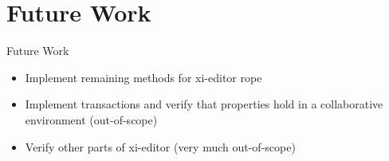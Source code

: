 \documentclass{beamer}
\begin{document}
\section{Future Work}


\begin{frame}{Future Work}
  \begin{itemize}
    \item Implement remaining methods for xi-editor rope
    \item Implement transactions and verify that properties hold in a collaborative environment (out-of-scope)
    \item Verify other parts of xi-editor (very much out-of-scope)
  \end{itemize}

\end{frame}
\end{document}
